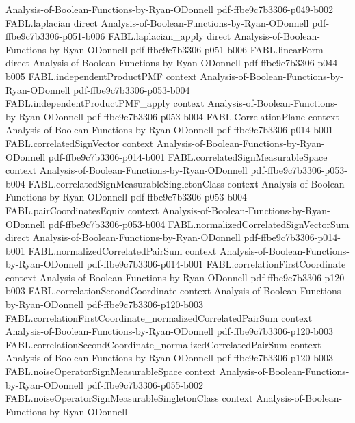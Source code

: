 \begin{theorem}
  {Analysis-of-Boolean-Functions-by-Ryan-ODonnell}
  {pdf-ffbe9c7b3306-p049-b002}
\proofstep
  {FABL.laplacian}
  {direct}
  {Analysis-of-Boolean-Functions-by-Ryan-ODonnell}
  {pdf-ffbe9c7b3306-p051-b006}
\proofstep
  {FABL.laplacian_apply}
  {direct}
  {Analysis-of-Boolean-Functions-by-Ryan-ODonnell}
  {pdf-ffbe9c7b3306-p051-b006}
\proofstep
  {FABL.linearForm}
  {direct}
  {Analysis-of-Boolean-Functions-by-Ryan-ODonnell}
  {pdf-ffbe9c7b3306-p044-b005}
\proofstep
  {FABL.independentProductPMF}
  {context}
  {Analysis-of-Boolean-Functions-by-Ryan-ODonnell}
  {pdf-ffbe9c7b3306-p053-b004}
\proofstep
  {FABL.independentProductPMF_apply}
  {context}
  {Analysis-of-Boolean-Functions-by-Ryan-ODonnell}
  {pdf-ffbe9c7b3306-p053-b004}
\proofstep
  {FABL.CorrelationPlane}
  {context}
  {Analysis-of-Boolean-Functions-by-Ryan-ODonnell}
  {pdf-ffbe9c7b3306-p014-b001}
\proofstep
  {FABL.correlatedSignVector}
  {context}
  {Analysis-of-Boolean-Functions-by-Ryan-ODonnell}
  {pdf-ffbe9c7b3306-p014-b001}
\proofstep
  {FABL.correlatedSignMeasurableSpace}
  {context}
  {Analysis-of-Boolean-Functions-by-Ryan-ODonnell}
  {pdf-ffbe9c7b3306-p053-b004}
\proofstep
  {FABL.correlatedSignMeasurableSingletonClass}
  {context}
  {Analysis-of-Boolean-Functions-by-Ryan-ODonnell}
  {pdf-ffbe9c7b3306-p053-b004}
\proofstep
  {FABL.pairCoordinatesEquiv}
  {context}
  {Analysis-of-Boolean-Functions-by-Ryan-ODonnell}
  {pdf-ffbe9c7b3306-p053-b004}
\proofstep
  {FABL.normalizedCorrelatedSignVectorSum}
  {direct}
  {Analysis-of-Boolean-Functions-by-Ryan-ODonnell}
  {pdf-ffbe9c7b3306-p014-b001}
\proofstep
  {FABL.normalizedCorrelatedPairSum}
  {context}
  {Analysis-of-Boolean-Functions-by-Ryan-ODonnell}
  {pdf-ffbe9c7b3306-p014-b001}
\proofstep
  {FABL.correlationFirstCoordinate}
  {context}
  {Analysis-of-Boolean-Functions-by-Ryan-ODonnell}
  {pdf-ffbe9c7b3306-p120-b003}
\proofstep
  {FABL.correlationSecondCoordinate}
  {context}
  {Analysis-of-Boolean-Functions-by-Ryan-ODonnell}
  {pdf-ffbe9c7b3306-p120-b003}
\proofstep
  {FABL.correlationFirstCoordinate_normalizedCorrelatedPairSum}
  {context}
  {Analysis-of-Boolean-Functions-by-Ryan-ODonnell}
  {pdf-ffbe9c7b3306-p120-b003}
\proofstep
  {FABL.correlationSecondCoordinate_normalizedCorrelatedPairSum}
  {context}
  {Analysis-of-Boolean-Functions-by-Ryan-ODonnell}
  {pdf-ffbe9c7b3306-p120-b003}
\proofstep
  {FABL.noiseOperatorSignMeasurableSpace}
  {context}
  {Analysis-of-Boolean-Functions-by-Ryan-ODonnell}
  {pdf-ffbe9c7b3306-p055-b002}
\proofstep
  {FABL.noiseOperatorSignMeasurableSingletonClass}
  {context}
  {Analysis-of-Boolean-Functions-by-Ryan-ODonnell}

\end{theorem}
